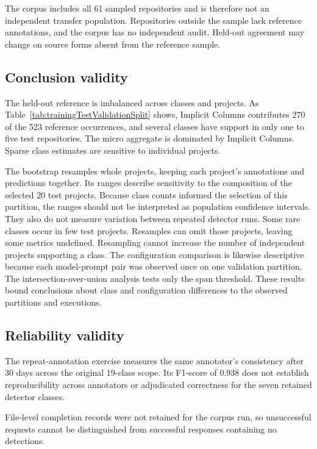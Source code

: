 The corpus includes all \num{61} sampled repositories and is therefore not an independent transfer population. Repositories outside the sample lack reference annotations, and the corpus has no independent audit. Held-out agreement may change on source forms absent from the reference sample.

\subsection{Conclusion validity}

The held-out reference is imbalanced across classes and projects. As Table~\ref{tab:trainingTestValidationSplit} shows, Implicit Columns contributes \num{270} of the \num{523} reference occurrences, and several classes have support in only one to five test repositories. The micro aggregate is dominated by Implicit Columns. Sparse class estimates are sensitive to individual projects.

The bootstrap resamples whole projects, keeping each project's annotations and predictions together. Its ranges describe sensitivity to the composition of the selected \num{20} test projects. Because class counts informed the selection of this partition, the ranges should not be interpreted as population confidence intervals. They also do not measure variation between repeated detector runs. Some rare classes occur in few test projects. Resamples can omit those projects, leaving some metrics undefined. Resampling cannot increase the number of independent projects supporting a class. The configuration comparison is likewise descriptive because each model-prompt pair was observed once on one validation partition. The intersection-over-union analysis tests only the span threshold. These results bound conclusions about class and configuration differences to the observed partitions and executions.

\subsection{Reliability validity}

The repeat-annotation exercise measures the same annotator's consistency after 30 days across the original 19-class scope. Its F1-score of \num{0.938} does not establish reproducibility across annotators or adjudicated correctness for the seven retained detector classes.

File-level completion records were not retained for the corpus run, so unsuccessful requests cannot be distinguished from successful responses containing no detections.

